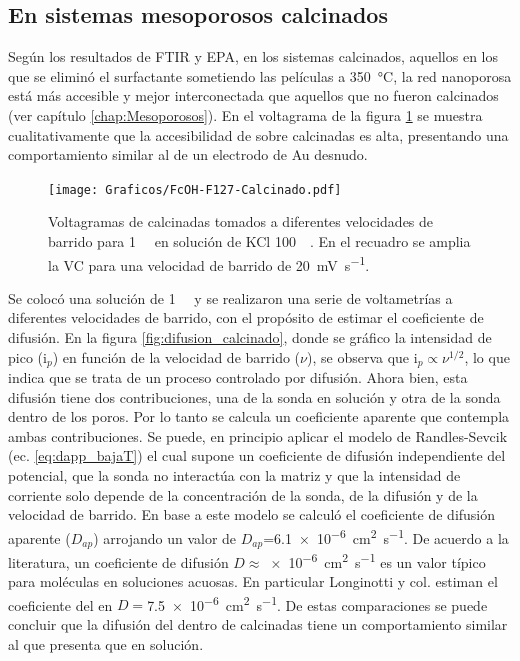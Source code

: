	\subsection{En sistemas mesoporosos calcinados}

	 Según los resultados de FTIR y EPA, en los sistemas calcinados, aquellos en los que se eliminó el surfactante sometiendo las películas a \SI{350}{\celsius}, la red nanoporosa está más accesible y mejor interconectada que aquellos que no fueron calcinados (ver capítulo \ref{chap:Mesoporosos}). En el voltagrama de la figura \ref{fig:fc_calcinado} se muestra cualitativamente que la accesibilidad de \fc\space sobre \pdmF\space calcinadas es alta, presentando una comportamiento similar al de un electrodo de Au desnudo. 

	 	\begin{figure}[ht]
				\centering
		 	    \texttt{[image: Graficos/FcOH-F127-Calcinado.pdf]}
		        \caption[Voltagrama para \fc\space en \pdm\space calcinadas]{Voltagramas de \pdmF\space calcinadas tomados a  diferentes velocidades de barrido para \fc\space \SI{1}{\milli\Molar} en solución de KCl \SI{100}{\milli\Molar}. En el recuadro se amplia la VC para una velocidad de barrido de \SI{20}{\milli\volt\per\second}.}
		        \label{fig:fc_calcinado}
		      	\end{figure}



	 Se colocó una solución de \fc\space \SI{1}{\milli\Molar} y se realizaron una serie de voltametrías a diferentes velocidades de barrido, con el propósito de estimar el coeficiente de difusión. En la figura \ref{fig:difusion_calcinado}, donde se gráfico la intensidad de pico (i$_p$) en función de la velocidad de barrido ($\nu$), se observa que $\text{i}_p \propto \nu^{1/2}$, lo que indica que se trata de un proceso controlado por difusión. Ahora bien, esta difusión tiene dos contribuciones, una de la sonda en solución y otra de la sonda dentro de los poros. Por lo tanto se calcula un coeficiente aparente que contempla ambas contribuciones. Se puede, en principio aplicar el modelo de Randles-Sevcik (ec. \ref{eq:dapp_bajaT}) el cual supone un coeficiente de difusión independiente del potencial, que la sonda no interactúa con la matriz y que la intensidad de corriente solo depende de la concentración de la sonda, de la difusión y de la velocidad de barrido. En base a este modelo se calculó el coeficiente de difusión aparente ($D_{ap}$) arrojando un valor de $D_{ap}$=\SI{6,1e-6}{\square\cm\per\second}. De acuerdo a la literatura, un coeficiente de difusión $D\approx$\SI{e-6}{\square\cm\per\second} es un valor típico para moléculas en soluciones acuosas. \cite{koryta1993,Otal2006} En particular Longinotti y col.\cite{longinotti2007} estiman el coeficiente del \fc\space en $D=$\SI{7,5e-6}{\square\cm\per\second}. De estas comparaciones se puede concluir que la difusión del \fc\space dentro de \pdmF\space calcinadas tiene un comportamiento similar al que presenta que en solución.


